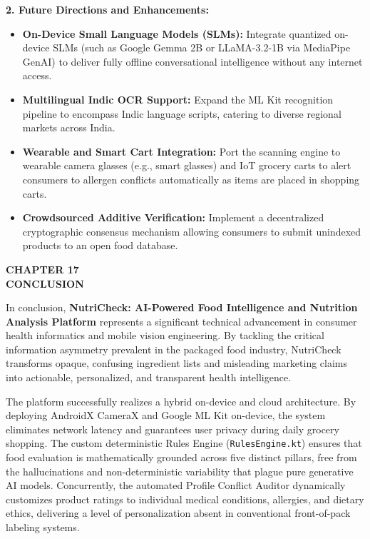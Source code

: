 \documentclass[12pt]{article}
\begin{document}
\noindent
\textbf{2. Future Directions and Enhancements:}
\begin{itemize}
    \item \textbf{On-Device Small Language Models (SLMs):} Integrate quantized on-device SLMs (such as Google Gemma 2B or LLaMA-3.2-1B via MediaPipe GenAI) to deliver fully offline conversational intelligence without any internet access.
    \item \textbf{Multilingual Indic OCR Support:} Expand the ML Kit recognition pipeline to encompass Indic language scripts, catering to diverse regional markets across India.
    \item \textbf{Wearable and Smart Cart Integration:} Port the scanning engine to wearable camera glasses (e.g., smart glasses) and IoT grocery carts to alert consumers to allergen conflicts automatically as items are placed in shopping carts.
    \item \textbf{Crowdsourced Additive Verification:} Implement a decentralized cryptographic consensus mechanism allowing consumers to submit unindexed products to an open food database.
\end{itemize}

\newpage

\begin{center}
\textbf{\Large CHAPTER 17}\\[0.5cm]
\textbf{\Large CONCLUSION}\\[1cm]
\end{center}

\noindent
In conclusion, \textbf{NutriCheck: AI-Powered Food Intelligence and Nutrition Analysis Platform} represents a significant technical advancement in consumer health informatics and mobile vision engineering. By tackling the critical information asymmetry prevalent in the packaged food industry, NutriCheck transforms opaque, confusing ingredient lists and misleading marketing claims into actionable, personalized, and transparent health intelligence.

\vspace{0.3cm}

\noindent
The platform successfully realizes a hybrid on-device and cloud architecture. By deploying AndroidX CameraX and Google ML Kit on-device, the system eliminates network latency and guarantees user privacy during daily grocery shopping. The custom deterministic Rules Engine (\texttt{RulesEngine.kt}) ensures that food evaluation is mathematically grounded across five distinct pillars, free from the hallucinations and non-deterministic variability that plague pure generative AI models. Concurrently, the automated Profile Conflict Auditor dynamically customizes product ratings to individual medical conditions, allergies, and dietary ethics, delivering a level of personalization absent in conventional front-of-pack labeling systems.
\end{document}
